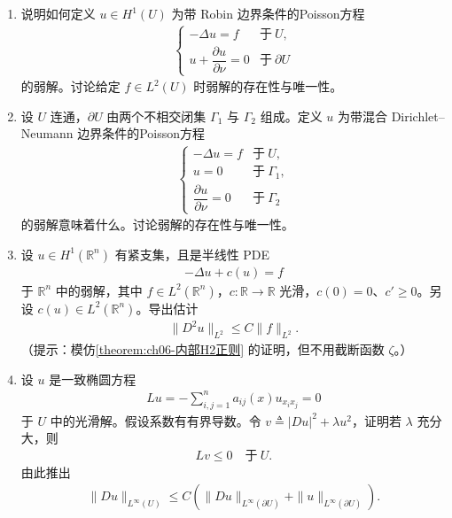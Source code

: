 \documentclass[../../main.tex]{subfiles}
\begin{document}
\begin{enumerate}
\item 说明如何定义 $u\in H^{1}(U)$ 为带 Robin 边界条件的Poisson方程
\begin{align*}
\begin{cases}
-\Delta u=f & \text{于}\ U,\\
u+\dfrac{\partial u}{\partial\nu}=0 & \text{于}\ \partial U
\end{cases}
\end{align*}
的弱解。讨论给定 $f\in L^{2}(U)$ 时弱解的存在性与唯一性。

\item 设 $U$ 连通，$\partial U$ 由两个不相交闭集 $\Gamma_{1}$ 与 $\Gamma_{2}$ 组成。定义 $u$ 为带混合 Dirichlet--Neumann 边界条件的Poisson方程
\begin{align*}
\begin{cases}
-\Delta u=f & \text{于}\ U,\\
u=0 & \text{于}\ \Gamma_{1},\\
\dfrac{\partial u}{\partial\nu}=0 & \text{于}\ \Gamma_{2}
\end{cases}
\end{align*}
的弱解意味着什么。讨论弱解的存在性与唯一性。

\item 设 $u\in H^{1}(\mathbb{R}^{n})$ 有紧支集，且是半线性 PDE
\begin{align*}
-\Delta u+c(u)=f
\end{align*}
于 $\mathbb{R}^{n}$ 中的弱解，其中 $f\in L^{2}(\mathbb{R}^{n})$，$c:\mathbb{R}\to\mathbb{R}$ 光滑，$c(0)=0$、$c'\geqslant 0$。另设 $c(u)\in L^{2}(\mathbb{R}^{n})$。导出估计
\begin{align*}
\|D^{2}u\|_{L^{2}}\leqslant C\|f\|_{L^{2}}.
\end{align*}
（提示：模仿\cref{theorem:ch06-内部H2正则} 的证明，但不用截断函数 $\zeta$。）

\item 设 $u$ 是一致椭圆方程
\begin{align*}
Lu=-\sum_{i,j=1}^{n}a_{ij}(x)u_{x_{i}x_{j}}=0
\end{align*}
于 $U$ 中的光滑解。假设系数有有界导数。令 $v\triangleq|Du|^{2}+\lambda u^{2}$，证明若 $\lambda$ 充分大，则
\begin{align*}
Lv\leqslant 0\quad\text{于}\ U.
\end{align*}
由此推出
\begin{align*}
\|Du\|_{L^{\infty}(U)}\leqslant C\left(\|Du\|_{L^{\infty}(\partial U)}+\|u\|_{L^{\infty}(\partial U)}\right).
\end{align*}


\end{enumerate}
\end{document}

